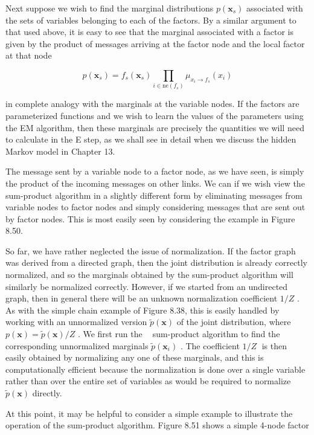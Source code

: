 \documentclass[
  10
]{article}
\begin{document}
Next suppose we wish to find the marginal distributions
\(p ( \mathbf { x } _ { s } )\) associated with the sets of variables
belonging to each of the factors. By a similar argument to that used
above, it is easy to see that the marginal associated with a factor is
given by the product of messages arriving at the factor node and the
local factor at that node

\[
p (\mathbf {x} _ {s}) = f _ {s} (\mathbf {x} _ {s}) \prod_ {i \in \mathrm{ne} (f _ {s})} \mu_ {x _ {i} \to f _ {s}} (x _ {i})\tag{8.72}
\]

in complete analogy with the marginals at the variable nodes. If the
factors are parameterized functions and we wish to learn the values of
the parameters using the EM algorithm, then these marginals are
precisely the quantities we will need to calculate in the E step, as we
shall see in detail when we discuss the hidden Markov model in Chapter
13.

The message sent by a variable node to a factor node, as we have seen,
is simply the product of the incoming messages on other links. We can if
we wish view the sum-product algorithm in a slightly different form by
eliminating messages from variable nodes to factor nodes and simply
considering messages that are sent out by factor nodes. This is most
easily seen by considering the example in Figure 8.50.

So far, we have rather neglected the issue of normalization. If the
factor graph was derived from a directed graph, then the joint
distribution is already correctly normalized, and so the marginals
obtained by the sum-product algorithm will similarly be normalized
correctly. However, if we started from an undirected graph, then in
general there will be an unknown normalization coefficient \(1 / Z\) .
As with the simple chain example of Figure 8.38, this is easily handled
by working with an unnormalized version
\(\widetilde { p } ( \mathbf { x } )\) of the joint distribution, where
\(p ( \mathbf { x } ) = \widetilde { p } ( \mathbf { x } ) / Z\) . We
first run the  sum-product algorithm to find the corresponding
unnormalized marginals
\(\widetilde { p } ( \boldsymbol { x } _ { i } )\) . The coefficient
\(1 / Z\) is then easily obtained by normalizing any one of these
marginals, and this is computationally efficient because the
normalization is done over a single variable rather than over the entire
set of variables as would be required to normalize
\(\widetilde { p } ( \mathbf { x } )\) directly.

At this point, it may be helpful to consider a simple example to
illustrate the operation of the sum-product algorithm. Figure 8.51 shows
a simple 4-node factor
\end{document}
